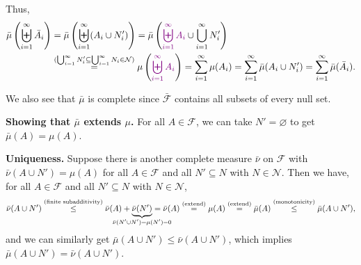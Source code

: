 \begin{enumerate}
\begin{pf}
\begin{enumerate}
\begin{enumerate}[label={(\arabic*)}]
Thus,
\begin{align*}
\bar{\mu}\left(\biguplus_{i=1}^{\infty}\bar{A}_i\right)
&=\bar{\mu}\left(\biguplus_{i=1}^{\infty}(A_i\cup N_i')\right)
=\bar{\mu}\left(\vc{\biguplus_{i=1}^{\infty}A_i}
\cup\bigcup_{i=1}^{\infty}N_i'
\right) \\
&\overset{(\bigcup_{i=1}^{\infty}N_i'\subseteq 
\bigcup_{i=1}^{\infty}N_i\in\mathcal{N}
)}{=}\mu\left(\vc{\biguplus_{i=1}^{\infty}A_i}\right)
=\sum_{i=1}^{\infty}\mu(A_i)
=\sum_{i=1}^{\infty}\bar{\mu}(A_i\cup N_i')
=\sum_{i=1}^{\infty}\bar{\mu}(\bar{A}_i).
\end{align*}
\end{enumerate}
We also see that \(\bar{\mu}\) is complete since
\(\bar{\mathcal{F}}\) contains all subsets of every null set.

\textbf{Showing that \(\bar{\mu}\) extends \(\mu\).}
For all \(A\in\mathcal{F}\), we can take \(N'=\varnothing\) to get
\(\bar{\mu}(A)=\mu(A)\).

\textbf{Uniqueness.} Suppose there is another complete measure
\(\bar{\nu}\) on \(\mathcal{F}\) with
\(\bar{\nu}(A\cup N')=\mu(A)\) for all \(A\in\mathcal{F}\) and all
\(N'\subseteq N\) with \(N\in\mathcal{N}\). Then we have, for all
\(A\in\mathcal{F}\) and all \(N'\subseteq N\) with \(N\in\mathcal{N}\),
\[
\bar{\nu}(A\cup N')\overset{\text{(finite subadditivity)}}{\le}\bar{\nu}(A)
+\underbrace{\bar{\nu}(N')}_{\mathclap{\bar{\nu}(N'\cup N')
=\mu(N')=0}}
=\bar{\nu}(A)
\overset{\text{(extend)}}{=}\mu(A)
\overset{\text{(extend)}}{=}
\bar{\mu}(A)
\overset{\text{(monotonicity)}}{\le}
\bar{\mu}(A\cup N'),
\]
and we can similarly get \(\bar{\mu}(A\cup N')\le\bar{\nu}(A\cup
N')\), which implies \(\bar{\mu}(A\cup N')=\bar{\nu}(A\cup N')\).
\end{enumerate}
\end{pf}
\end{enumerate}
